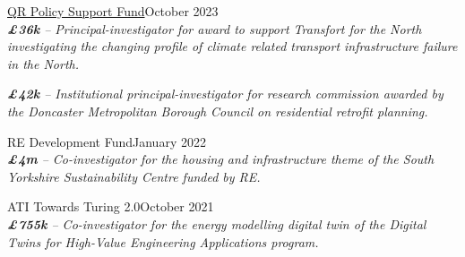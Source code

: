 \documentclass[10pt]{article}
\newcommand{\blankline}{\quad\pagebreak[3]}
\begin{document}
\blankline

\href{}{QR Policy Support Fund}\hfill {October 2023}\\
\emph{\textbf{\pounds36k} -- Principal-investigator for award to support Transfort for the North investigating the changing profile of climate related transport infrastructure failure in the North.}
\FPset{}
\FPset{}

\blankline

%

%
%
\emph{\textbf{\pounds42k} -- Institutional principal-investigator for research commission awarded by the Doncaster Metropolitan Borough Council on residential retrofit planning.}
\FPset{}
\FPset{}

\blankline
%


RE Development Fund\hfill {January 2022}\\
\emph{\textbf{\pounds4m} -- Co-investigator for the housing and infrastructure theme of the South Yorkshire Sustainability Centre funded by RE.}
\FPset{}
\FPset{}

\blankline

ATI Towards Turing 2.0\hfill {October 2021}\\
\emph{\textbf{\pounds755k} -- Co-investigator for the energy modelling digital twin of the Digital Twins for High-Value Engineering Applications program.}
\FPset{}
\FPset{}
\end{document}
